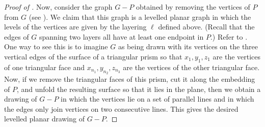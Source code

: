 \documentclass{patmorin}
\begin{document}
\begin{proof}[Proof of ]
  Now, consider the graph $G-P$ obtained by removing the vertices of $P$
  from $G$ (see ).  We claim that this graph is a levelled
  planar graph in which the levels
  of the vertices are given by the layering $\ell$ defined above. (Recall that the edges of $G$ spanning two layers all have at least one endpoint in $P$.)
  Refer to . One way to see this is to imagine $G$
  as being drawn with its vertices on the three vertical edges of the surface of
  a triangular prism so that $x_1,y_1,z_1$ are the vertices of one
  triangular face and $x_{n_1},y_{n_2},z_{n_3}$ are the vertices of
  the other triangular face.  Now, if we remove the triangular faces
  of this prism, cut it along the embedding of $P$, and unfold
  the resulting surface so that it lies in the plane, then we obtain a
  drawing of $G-P$ in which the vertices lie on a set of parallel lines
  and in which the edges only join vertices on two consecutive lines.
  This gives the desired levelled planar drawing of $G-P$.



\end{proof}
\end{document}
